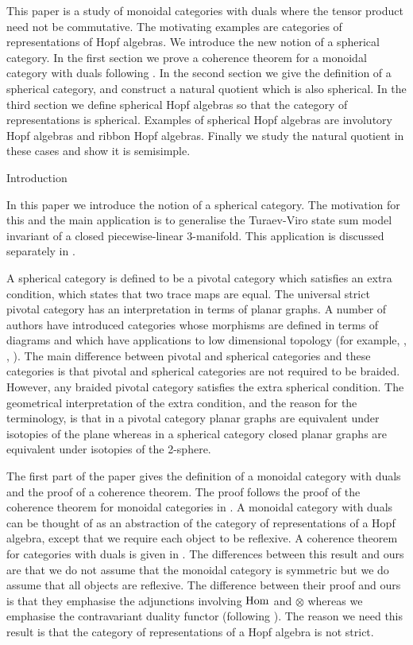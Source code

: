 \abstract
This paper is a study of monoidal categories with duals where the tensor
product need not be commutative. The motivating examples are categories
of representations of Hopf algebras. We introduce the new notion of a
spherical category. In the first section we prove a coherence theorem 
for a monoidal category with duals following \cite{MacLane  1963}.
In the second section we give the definition of a spherical category,
and construct a natural quotient which is also spherical.
In the third section we define spherical Hopf algebras so that the category
of representations is spherical. Examples of spherical Hopf algebras are 
involutory Hopf algebras and ribbon Hopf algebras. Finally we study the
natural quotient in these cases and show it is semisimple.
\endabstract
\endtopmatter

\document
{} Introduction \endhead

In this paper we introduce the notion of a spherical category. The
motivation for this and the main application is to generalise the
Turaev-Viro state sum model invariant of a closed piecewise-linear
3-manifold. This application is discussed separately in \cite{Barrett and Westbury 1996}.

A spherical category is defined to be a pivotal category which satisfies
an extra condition, which states that two trace maps are equal. 
The universal strict pivotal category has an interpretation
in terms of planar graphs. A number of authors have introduced
categories whose morphisms are defined in terms of diagrams and which
have applications to low dimensional topology (for example,
\cite{Freyd and Yetter  1989}, \cite{Joyal and Street  1991}, \cite{Reshetikhin and Turaev  1990}).
The main difference between pivotal and spherical categories and these
categories is that pivotal and spherical categories are not required to be
braided. However, any braided pivotal category satisfies the extra spherical
condition. The geometrical interpretation of the extra condition, and the
reason for the terminology, is that in a pivotal category planar graphs
are equivalent under isotopies of the plane whereas in a spherical category
closed planar graphs are equivalent under isotopies of the 2-sphere.

The first part of the paper gives the definition of a monoidal category 
with duals and the proof of a coherence theorem. The proof follows the proof
of the coherence theorem for monoidal categories in \cite{MacLane  1963}. 
A monoidal category with duals can be thought of
as an abstraction of the category of representations of a Hopf algebra,
except that we require each object to be reflexive.
A coherence theorem for categories with duals is given in \cite{Kelly and Laplaza  1980}.
The differences between this result and ours are that we do not assume that
the monoidal category is symmetric but we do assume that all objects are
reflexive. The difference between their proof and ours is that they emphasise
the adjunctions involving $\operatorname{Hom}$ and $\otimes$ whereas we emphasise the
contravariant duality functor (following \cite{Freyd and Yetter  1989}). The reason we
need this result is that the category of representations of a Hopf algebra
is not strict.

